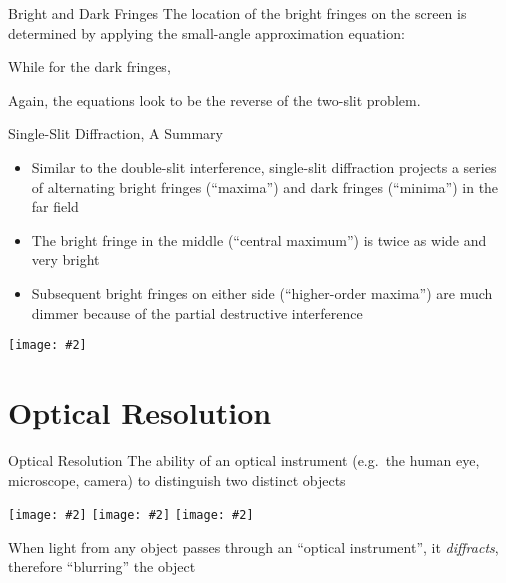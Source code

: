 \documentclass[compress,aspectratio=169]{beamer}
\newcommand{\pic}[2]{\texttt{[image: \#2]}}
\newcommand{\eq}[2]{\vspace{#1}{\LARGE\begin{displaymath}#2\end{displaymath}}}
\begin{document}
\begin{frame}{Bright and Dark Fringes}
  The location of the bright fringes on the screen is determined by applying
  the small-angle approximation equation:
  
  \eq{-.2in}{
    \boxed{y_m=\left(m+\frac{1}{2}\right)\frac{\lambda L}{W}}
  }

  While for the dark fringes, 

  \eq{-.2in}{
    \boxed{y_m=\frac{m\lambda L}{W}}
  }

  Again, the equations look to be the reverse of the two-slit problem.
\end{frame}



\begin{frame}{Single-Slit Diffraction, A Summary}
  \begin{itemize}
  \item Similar to the double-slit interference, single-slit diffraction
    projects a series of alternating bright fringes (``maxima'') and dark
    fringes (``minima'') in the far field
  \item The bright fringe in the middle (``central maximum'') is twice as wide
    and very bright
  \item Subsequent bright fringes on either side (``higher-order maxima'') are
    much dimmer because of the partial destructive interference
  \end{itemize}
  \begin{center}
    \pic{.5}{graphics/Single_Slit_Diffraction.png}
  \end{center}
\end{frame}



\section{Optical Resolution}

\begin{frame}{Optical Resolution}
  The ability of an optical instrument (e.g.\ the human eye, microscope,
  camera) to distinguish two distinct objects
  \begin{center}
    \pic{.322}{graphics/resolve1.png}\hspace{.05in}
    \pic{.322}{graphics/resolve2.png}\hspace{.05in}
    \pic{.322}{graphics/resolve3.png}\hspace{.05in}
  \end{center}
  When light from any object passes through an ``optical instrument'', it
  \emph{diffracts}, therefore ``blurring'' the object
\end{frame}
\end{document}
